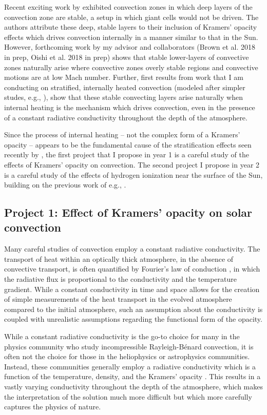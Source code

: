 \documentclass[aasms,12pt]{article}
\newcommand{\RB}{Rayleigh-B\'{e}nard }
\begin{document}
Recent exciting work by \cite{kapyla&all2017}
exhibited convection zones in which deep layers of the convection
zone are stable, a setup in which giant cells would not be driven.  
The authors attribute these deep, stable layers to their inclusion of Kramers' opacity
effects which drives convection internally in a manner similar to that in the Sun.  
However, forthcoming work by my advisor and collaborators (Brown et al. 2018 in prep, Oishi et al. 2018 in prep) 
shows that 
stable lower-layers of convective zones naturally arise where convective zones overly stable regions
and convective motions are at low Mach number.
Further, first results from work that I am conducting on stratified, internally
heated convection (modeled after simpler studes, e.g., \cite{goluskin&spiegel2012}),
show that these stable convecting layers arise naturally when internal heating is the mechanism which
drives convection, even in the presence of a constant radiative conductivity throughout the depth of the atmosphere.

Since the process of internal heating -- not the complex form of a Kramers' opacity --
appears to be the fundamental cause of the stratification effects seen recently by \cite{kapyla&all2017},
the first project that I propose in year 1 is a careful study of the effects of Kramers' opacity on convection.
The second project I propose in year 2 is a careful study of the effects of hydrogen ionization near the surface
of the Sun, building on the previous work of e.g., \cite{rast&toomre1993}.

\subsection{Project 1: Effect of Kramers' opacity on solar convection}
Many careful studies of convection employ a constant radiative conductivity.
The transport of heat within an optically thick atmosphere, in the absence of convective transport,
is often quantified by Fourier's law of conduction \citep{lecoanet&all2014}, in which the radiative
flux is proportional to the conductivity and the temperature gradient.  
While a constant conductivity in time and space allows for the creation of simple measurements of the
heat transport in the evolved atmosphere compared to the initial atmosphere, such an assumption about
the conductivity is coupled with unrealistic assumptions regarding the functional form of the opacity.  

While a constant radiative
conductivity is the go-to choice for many in the physics community who study incompressible
\RB convection, it is often not the choice for those in the heliophysics or astrophysics
communities.  Instead, these communities generally employ a radiative conductivity which is a function
of the temperature, density, and the Kramers' opacity \citep{barekat&brandenburg2014, brandenburg2016, kapyla&all2017}.
This results in a vastly varying conductivity throughout the depth of the atmosphere, which makes the
interpretation of the solution much more difficult but which more carefully captures the physics of nature.
\end{document}
